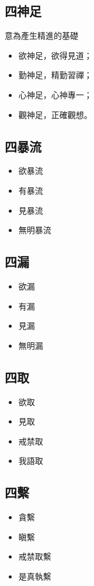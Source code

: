 \subsection{四神足}
意為產生精進的基礎
\begin{itemize}
  \item 欲神足，欲得見道；
  \item 勤神足，精勤習禪；
  \item 心神足，心神專一；
  \item 觀神足，正確觀想。
\end{itemize}


\subsection{四暴流}
\begin{itemize}
  \item 欲暴流
  \item 有暴流
  \item 見暴流
  \item 無明暴流
\end{itemize}

\subsection{四漏}
\begin{itemize}
  \item 欲漏
  \item 有漏
  \item 見漏
  \item 無明漏
\end{itemize}

\subsection{四取}
\begin{itemize}
  \item 欲取  \item 見取  \item 戒禁取  \item 我語取
\end{itemize}

\subsection{四繫}
\begin{itemize}
  \item 貪繫  \item 瞋繫  \item 戒禁取繫  \item 是真執繫
\end{itemize}
